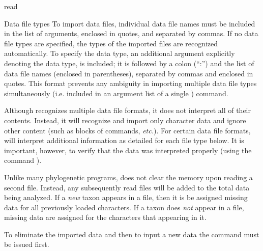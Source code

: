 \begin{command}{read}{}
\begin{arguments}
	    \begin{argumentgroup}{Data file types}
	        To import data files, individual data file names must be included in
            the list of  arguments, enclosed in quotes, and
            separated by commas. If no data file types are specified, the types
            of the imported files are recognized automatically. To specify the
            data type, an additional argument explicitly denoting the data type,
            is included; it is followed by a colon (``:'') and the list of data
            file names (enclosed in parentheses), separated by commas and
            enclosed in quotes. This format prevents any ambiguity in importing
            multiple data file types simultaneously (i.e. included in an
            argument list of a single ) command.

	\end{argumentgroup}
	
	        \begin{statement}
            Although \poy recognizes multiple data file formats, it does not
            interpret all of their contents. Instead, it will recognize and import
            only character data and ignore other content (such as blocks of
            commands, \emph{etc.}). For certain data file formats, \poy will interpret
            additional information as detailed for each file type below.
            It is important, however, to verify that the data was interpreted properly (using
            the command ).
            \end{statement}
            
                \begin{statement}
            Unlike many phylogenetic programs, \poy does not clear the memory
            upon reading a second file. Instead, any subsequently read files
            will be added to the total data being analyzed.  If a \emph{new} taxon
            appears in a file, then it is be assigned missing data for all
            previously loaded characters. If a taxon does \emph{not} appear in a
            file, missing data are assigned for the characters that appearing in it. 

 \setlength{\parindent}{0.5cm}                                
                \indent To eliminate the imported data and then to input a new data
            the  command must be issued first. 
        \end{statement}
        

\end{arguments}
\end{command}
